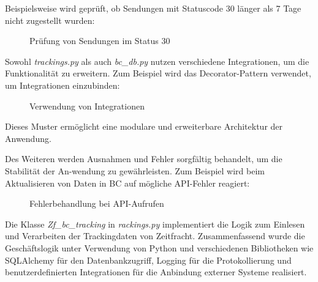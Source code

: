 Beispielsweise wird geprüft, ob Sendungen mit Statuscode 30 länger als 7 Tage nicht zugestellt wurden:

\begin{figure}[htb]
    \centering
    \caption{Prüfung von Sendungen im Status 30}
    \label{fig:viewStatus}
\end{figure}


Sowohl \textit{trackings.py} als auch \textit{bc\_db.py} nutzen verschiedene Integrationen, um die Funktionalität zu erweitern. 
Zum Beispiel wird das Decorator-Pattern verwendet, um Integrationen einzubinden:

\begin{figure}[htb]
    \centering
    \caption{Verwendung von Integrationen}
    \label{fig:Integrationen}
\end{figure}


Dieses Muster ermöglicht eine modulare und erweiterbare Architektur der Anwendung.

\clearpage

Des Weiteren werden Ausnahmen und Fehler sorgfältig behandelt, um die Stabilität der An-wendung zu gewährleisten. 
Zum Beispiel wird beim Aktualisieren von Daten in BC auf mögliche API-Fehler reagiert:

\begin{figure}[htb]
    \centering
    \caption{Fehlerbehandlung bei API-Aufrufen}
    \label{fig:viewAPI}
\end{figure}

Die Klasse \textit{Zf\_bc\_tracking} in \textit{rackings.py} implementiert die Logik zum Einlesen und Verarbeiten der Trackingdaten 
von Zeitfracht. Zusammenfassend wurde die Geschäftslogik unter Verwendung von Python und verschiedenen Bibliotheken wie SQLAlchemy 
für den Datenbankzugriff, Logging für die Protokollierung und benutzerdefinierten Integrationen für die Anbindung externer Systeme realisiert.


























